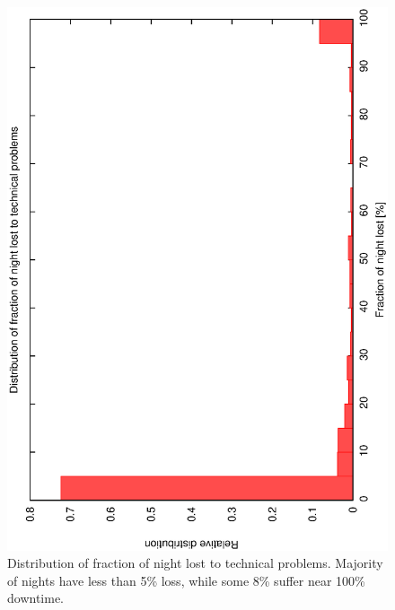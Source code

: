 \begin{figure}[htbp]  
  \begin{center}
    \includegraphics[scale=0.4, angle=-90]{figures/ecs/tech_loss_frac.eps}
  \end{center}
  \caption[Distribution of fraction of night lost to technical problems.]
   {Distribution of fraction of night lost to technical problems. Majority of nights have less than 5\% loss, while some 8\% suffer near 100\% downtime.}
  \label{fig:tech_loss_dist}
\end{figure}

